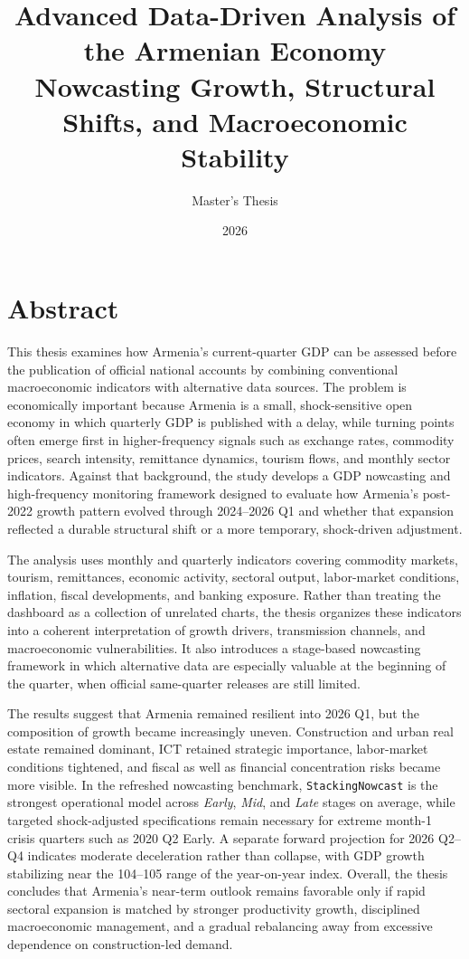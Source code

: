 \documentclass[12pt,a4paper]{report}
\title{Advanced Data-Driven Analysis of the Armenian Economy \\ \large Nowcasting Growth, Structural Shifts, and Macroeconomic Stability}
\author{Master's Thesis}
\date{2026}
\begin{document}
\maketitle
\tableofcontents

\chapter*{Abstract}
This thesis examines how Armenia's current-quarter GDP can be assessed before the publication of official national accounts by combining conventional macroeconomic indicators with alternative data sources. The problem is economically important because Armenia is a small, shock-sensitive open economy in which quarterly GDP is published with a delay, while turning points often emerge first in higher-frequency signals such as exchange rates, commodity prices, search intensity, remittance dynamics, tourism flows, and monthly sector indicators. Against that background, the study develops a GDP nowcasting and high-frequency monitoring framework designed to evaluate how Armenia's post-2022 growth pattern evolved through 2024--2026 Q1 and whether that expansion reflected a durable structural shift or a more temporary, shock-driven adjustment.

The analysis uses monthly and quarterly indicators covering commodity markets, tourism, remittances, economic activity, sectoral output, labor-market conditions, inflation, fiscal developments, and banking exposure. Rather than treating the dashboard as a collection of unrelated charts, the thesis organizes these indicators into a coherent interpretation of growth drivers, transmission channels, and macroeconomic vulnerabilities. It also introduces a stage-based nowcasting framework in which alternative data are especially valuable at the beginning of the quarter, when official same-quarter releases are still limited.

The results suggest that Armenia remained resilient into 2026 Q1, but the composition of growth became increasingly uneven. Construction and urban real estate remained dominant, ICT retained strategic importance, labor-market conditions tightened, and fiscal as well as financial concentration risks became more visible. In the refreshed nowcasting benchmark, \texttt{StackingNowcast} is the strongest operational model across \textit{Early}, \textit{Mid}, and \textit{Late} stages on average, while targeted shock-adjusted specifications remain necessary for extreme month-1 crisis quarters such as 2020 Q2 Early. A separate forward projection for 2026 Q2--Q4 indicates moderate deceleration rather than collapse, with GDP growth stabilizing near the 104--105 range of the year-on-year index. Overall, the thesis concludes that Armenia's near-term outlook remains favorable only if rapid sectoral expansion is matched by stronger productivity growth, disciplined macroeconomic management, and a gradual rebalancing away from excessive dependence on construction-led demand.
\end{document}
